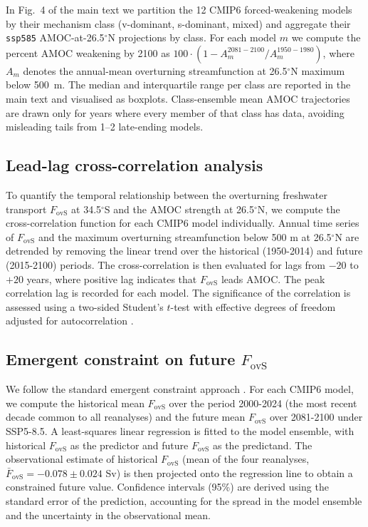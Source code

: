 \documentclass[11pt,a4paper]{article}
\begin{document}
In Fig.~4 of the main text we partition the 12 CMIP6 forced-weakening models by their mechanism class (v-dominant, s-dominant, mixed) and aggregate their \texttt{ssp585} AMOC-at-26.5$^\circ$N projections by class. For each model $m$ we compute the percent AMOC weakening by 2100 as $100\cdot (1 - A_m^{2081-2100} / A_m^{1950-1980})$, where $A_m$ denotes the annual-mean overturning streamfunction at 26.5$^\circ$N maximum below 500~m. The median and interquartile range per class are reported in the main text and visualised as boxplots. Class-ensemble mean AMOC trajectories are drawn only for years where every member of that class has data, avoiding misleading tails from 1--2 late-ending models.

\subsection*{Lead-lag cross-correlation analysis}

To quantify the temporal relationship between the overturning freshwater transport \(F_{\mathrm{ovS}}\) at 34.5$^\circ$S and the AMOC strength at 26.5$^\circ$N, we compute the cross-correlation function for each CMIP6 model individually. Annual time series of \(F_{\mathrm{ovS}}\) and the maximum overturning streamfunction below 500 m at 26.5$^\circ$N are detrended by removing the linear trend over the historical (1950-2014) and future (2015-2100) periods. The cross-correlation is then evaluated for lags from \(-20\) to \(+20\) years, where positive lag indicates that \(F_{\mathrm{ovS}}\) leads AMOC. The peak correlation lag is recorded for each model. The significance of the correlation is assessed using a two-sided Student's \(t\)-test with effective degrees of freedom adjusted for autocorrelation \citep{Santer2000}.

\subsection*{Emergent constraint on future \(F_{\mathrm{ovS}}\)}

We follow the standard emergent constraint approach \citep{Portmann2026, ArumiPlanas2024}. For each CMIP6 model, we compute the historical mean \(F_{\mathrm{ovS}}\) over the period 2000-2024 (the most recent decade common to all reanalyses) and the future mean \(F_{\mathrm{ovS}}\) over 2081-2100 under SSP5-8.5. A least-squares linear regression is fitted to the model ensemble, with historical \(F_{\mathrm{ovS}}\) as the predictor and future \(F_{\mathrm{ovS}}\) as the predictand. The observational estimate of historical \(F_{\mathrm{ovS}}\) (mean of the four reanalyses, \(\bar{F}_{\mathrm{ovS}} = -0.078\pm0.024\) Sv) is then projected onto the regression line to obtain a constrained future value. Confidence intervals (95\%) are derived using the standard error of the prediction, accounting for the spread in the model ensemble and the uncertainty in the observational mean.
\end{document}
